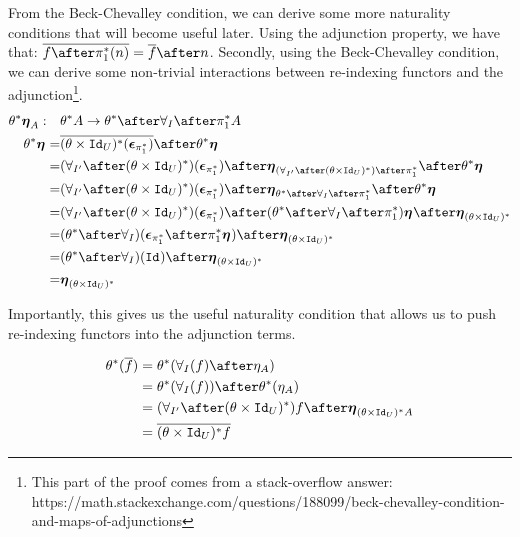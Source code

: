 \documentclass{Report}
\begin{document}
From the Beck-Chevalley condition, we can derive some more naturality conditions that will become useful later.
Using the adjunction property, we have that: $\bar{f\after\pstar(n)} = \bar{f}\after n$. Secondly, using the Beck-Chevalley condition, we can derive some non-trivial interactions between re-indexing functors and the adjunction\footnote{This part of the proof comes from a stack-overflow answer: https://math.stackexchange.com/questions/188099/beck-chevalley-condition-and-maps-of-adjunctions}. 
    \begin{align}
        \theta\star\unit{A}:\quad&\theta\star A \rightarrow \theta\star\after\allI\after\pstar A\\
        \theta\star\unit{} =& \bar{(\theta\times\Id{U})\star(\counit{\pstar})}\after\theta\star\unit{}\\
        =& (\allII\after(\theta\times\Id{U})\star)(\counit{\pstar})\after\unit{(\allII\after(\theta\times\Id{U})\star)\after\pstar}\after\theta\star\unit{}\\
        = & (\allII\after(\theta\times\Id{U})\star)(\counit{\pstar})\after\unit{\theta\star\after\allI\after\pstar}\after\theta\star\unit{}\\
        = & (\allII\after(\theta\times\Id{U})\star)(\counit{\pstar}) \after(\theta\star\after\allI\after\pstar)\unit{} \after\unit{(\theta\times\Id{U})\star}\\
        = & (\theta\star\after\allI)(\counit{\pstar}
        \after\pstar\unit{})\after\unit{(\theta\times\Id{U})\star}\\
        = & (\theta\star\after\allI)(\Id{})\after\unit{(\theta\times\Id{U})\star}\\
        = & \unit{(\theta\times\Id{U})\star}
    \end{align}

    Importantly, this gives us the useful naturality condition that allows us to push re-indexing functors into the adjunction terms.

    \begin{align}\label{NaturalityCondition}
        \theta\star(\bar{f}) & = \theta\star(\allI(f)\after\eta_A)\\
        & = \theta\star(\allI(f))\after\theta\star(\eta_A)\\
        & =  (\allII\after(\theta\times\Id{U})\star)f \after\unit{(\theta\times\Id{U})\star A}\\
        & = \bar{(\theta\times\Id{U})\star f}\\
    \end{align}
\end{document}
